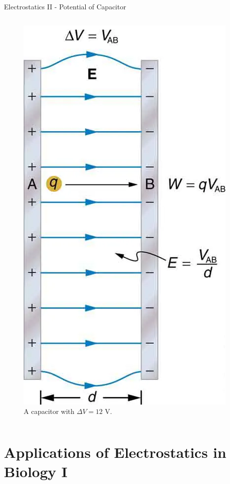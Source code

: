 \documentclass{beamer}
\begin{document}
\begin{frame}{Electrostatics II - Potential of Capacitor}
\begin{columns}[T]
\begin{column}{0.275\textwidth}
\begin{figure}
\includegraphics[width=\textwidth]{figures/cap2.png}
\caption{\label{fig:cap4} A capacitor with $\Delta V = 12$ V.}
\end{figure}
\end{column}
\end{columns}
\end{frame}

\section{Applications of Electrostatics in Biology I}
\end{document}
